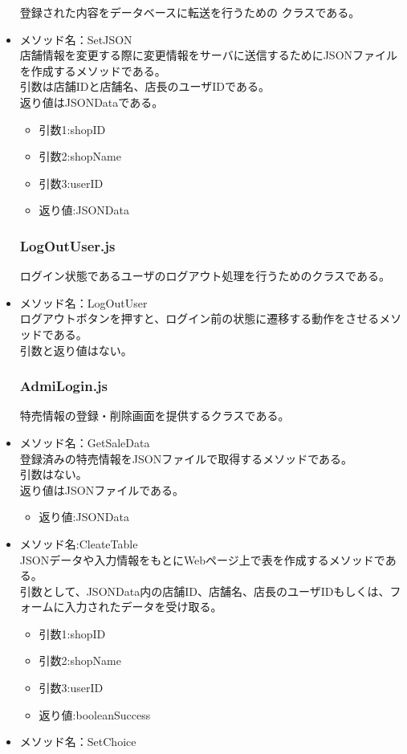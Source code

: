 \documentclass[a4j]{jarticle}
\begin{document}
\begin{itemize}
登録された内容をデータベースに転送を行うための
クラスである。

\item メソッド名：SetJSON\\

店舗情報を変更する際に変更情報をサーバに送信するためにJSONファイルを作成するメソッドである。\\
引数は店舗IDと店舗名、店長のユーザIDである。\\
返り値はJSONDataである。
	\begin{itemize}
		\item 引数1:shopID
		\item 引数2:shopName
		\item 引数3:userID
		\item 返り値:JSONData
	\end{itemize}
\subsubsection{LogOutUser.js}

ログイン状態であるユーザのログアウト処理を行うためのクラスである。
%
\item メソッド名：LogOutUser\\

ログアウトボタンを押すと、ログイン前の状態に遷移する動作をさせるメソッドである。\\
引数と返り値はない。
%
\subsubsection{AdmiLogin.js}

特売情報の登録・削除画面を提供するクラスである。
\item メソッド名：GetSaleData\\

登録済みの特売情報をJSONファイルで取得するメソッドである。\\
引数はない。\\
返り値はJSONファイルである。
	\begin{itemize}	
		\item 返り値:JSONData
	\end{itemize}


\item メソッド名:CleateTable\\

JSONデータや入力情報をもとにWebページ上で表を作成するメソッドである。\\
引数として、JSONData内の店舗ID、店舗名、店長のユーザIDもしくは、フォームに入力されたデータを受け取る。
	\begin{itemize}	
		\item 引数1:shopID
		\item 引数2:shopName
		\item 引数3:userID
		\item 返り値:booleanSuccess
	\end{itemize}
\item メソッド名：SetChoice\\


\end{itemize}
\end{document}
